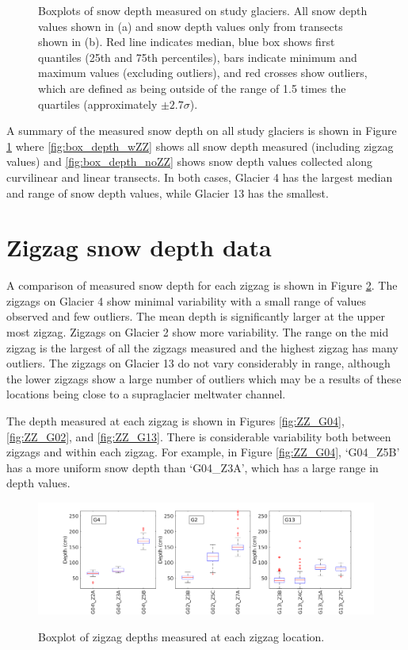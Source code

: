\documentclass[12pt]{article}
\begin{document}
\begin{figure}[H]
    \caption{Boxplots of snow depth measured on study glaciers. All snow depth values shown in (a) and snow depth values only from transects shown in (b). Red line indicates median, blue box shows first quantiles (25th and 75th percentiles), bars indicate minimum and maximum values (excluding outliers), and red crosses show outliers, which are defined as being outside of the range of 1.5 times the quartiles (approximately $\pm2.7\sigma$).}
    \label{fig:box_depth}
\end{figure}

A summary of the measured snow depth on all study glaciers is shown in Figure \ref{fig:box_depth} where \ref{fig:box_depth_wZZ} shows all snow depth measured (including zigzag values) and \ref{fig:box_depth_noZZ} shows snow depth values collected along curvilinear and linear transects. In both cases, Glacier 4 has the largest median and range of snow depth values, while Glacier 13 has the smallest. 

\pagebreak
\section{Zigzag snow depth data}

A comparison of measured snow depth for each zigzag is shown in Figure \ref{fig:ZZ_boxplot}. The zigzags on Glacier 4 show minimal variability with a small range of values observed and few outliers. The mean depth is significantly larger at the upper most zigzag. Zigzags on Glacier 2 show more variability. The range on the mid zigzag is the largest of all the zigzags measured and the highest zigzag has many outliers. The zigzags on Glacier 13 do not vary considerably in range, although the lower zigzags show a large number of outliers which may be a results of these locations being close to a supraglacier meltwater channel. 

The depth measured at each zigzag is shown in Figures \ref{fig:ZZ_G04}, \ref{fig:ZZ_G02}, and \ref{fig:ZZ_G13}. There is considerable variability both between zigzags and within each zigzag. For example, in Figure \ref{fig:ZZ_G04}, `G04\_Z5B' has a more uniform snow depth than `G04\_Z3A', which has a large range in depth values. 
{
\begin{figure} 
	\centering
	\includegraphics[width = 1.1\textwidth]{Zigzag_Boxplot.png}\\
	\caption{Boxplot of zigzag depths measured at each zigzag location.}
	\label{fig:ZZ_boxplot}
\end{figure}
}
\end{document}

